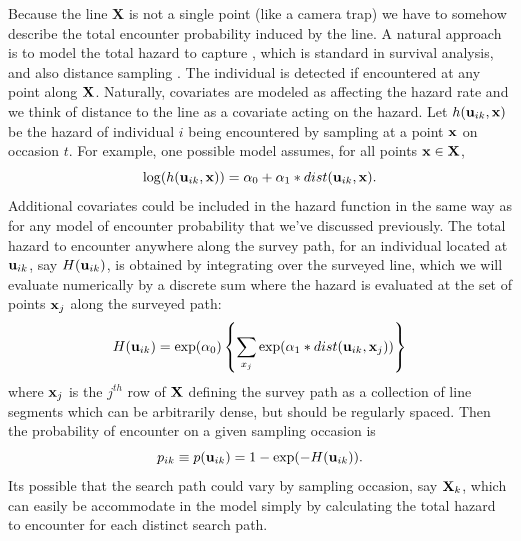 Because the line {\bf X} is not a single point (like a camera trap) we
have to somehow describe the total encounter probability induced by
the line. A natural approach is to model the total hazard to capture
\citep{borchers_efford:2008}, which is standard in survival analysis,
and also distance sampling \citep{hayes_buckland:1983,
  skaug_schweder:1999}.  The individual is detected 
if encountered at any point along ${\bf X}$. Naturally,
covariates are modeled as affecting the hazard rate and we think of
distance to the line as a covariate acting on the hazard. Let $h({\bf
  u}_{ik},{\bf x})$ be the hazard of individual $i$ being encountered
by sampling at a point ${\bf x}$ on occasion $t$.  For example, one
possible model assumes, for all points ${\bf x} \in {\bf X}$,
\begin{equation}
\log(h({\bf u}_{ik},{\bf x})) = \alpha_{0} + \alpha_{1}*dist({\bf u}_{ik},{\bf x}).
\label{eq.hazard}
\end{equation}
Additional covariates could be included in the hazard function in the
same way as for any model of encounter probability that we've
discussed previously.  The total hazard to encounter anywhere along
the survey path, for an individual located at ${\bf u}_{ik}$, say
$H({\bf u}_{ik})$, is obtained by integrating over the surveyed line,
which we will evaluate numerically by a discrete sum where the hazard
is evaluated at the set of points ${\bf x}_{j}$ along the surveyed
path:
\begin{equation}
H({\bf u}_{ik}) =  \exp(\alpha_{0}) \left\{ \sum_{x_{j}}  \exp(\alpha_{1}*dist({\bf
    u}_{ik},{\bf x}_{j})) \right\}
\label{eq.totalhazard}
\end{equation}
where ${\bf x}_{j}$ is the $j^{th}$ row of ${\bf X}$ defining the
survey path as a collection of line segments which can be arbitrarily
dense, but should be regularly spaced.  Then the probability of
encounter on a given sampling occasion  
is
\begin{equation}
p_{ik} \equiv p({\bf u}_{ik}) = 1- \exp(-H({\bf u}_{ik})).
\label{search-encounter.eq.encounterprob}
\end{equation}
Its possible that the search path could vary by sampling occasion, say
${\bf X}_{k}$, which can easily be accommodate in the model simply by
calculating the total hazard to encounter for each distinct search
path.

